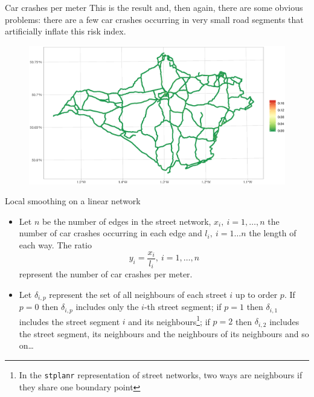 \documentclass[c,10pt,pdftex]{beamer}
\begin{document}
\begin{frame}{Car crashes per meter}
\vspace{-0.25cm}
This is the result and, then again, there are some obvious problems: there are a few car crashes occurring in very small road segments that artificially inflate this risk index.  
\begin{figure}
	\centering
	\includegraphics[width=\linewidth]{images/car_crashes_per_meter}
\end{figure}
\end{frame}

\begin{frame}{Local smoothing on a linear network}
\vspace{-0.75cm}
\begin{itemize}
	\setlength\itemsep{1em}
	\item Let $n$ be the number of edges in the street network, $x_i, \ i = 1,\dots,n$ the number of car crashes occurring in each edge and $l_i, \ i = 1\dots n$ the length of each way. The ratio 
	\[
	y_i = \frac{x_i}{l_i}, \ i = 1, \dots, n
	\] 
	represent the number of car crashes per meter. 
	
	\item Let $\delta_{i, p}$ represent the set of all neighbours of each street $i$ up to order $p$. If $p = 0$ then $\delta_{i, p}$ includes only the $i$-th street segment; if $p = 1$ then $\delta_{i, 1}$ includes the street segment $i$ and its neighbours\footnote{In the \texttt{stplanr} representation of street networks, two ways are neighbours if they share one boundary point}; if $p = 2$ then $\delta_{i,2}$ includes the street segment, its neighbours and the neighbours of its neighbours and so on\dots
\end{itemize}
\end{frame}
\end{document}
